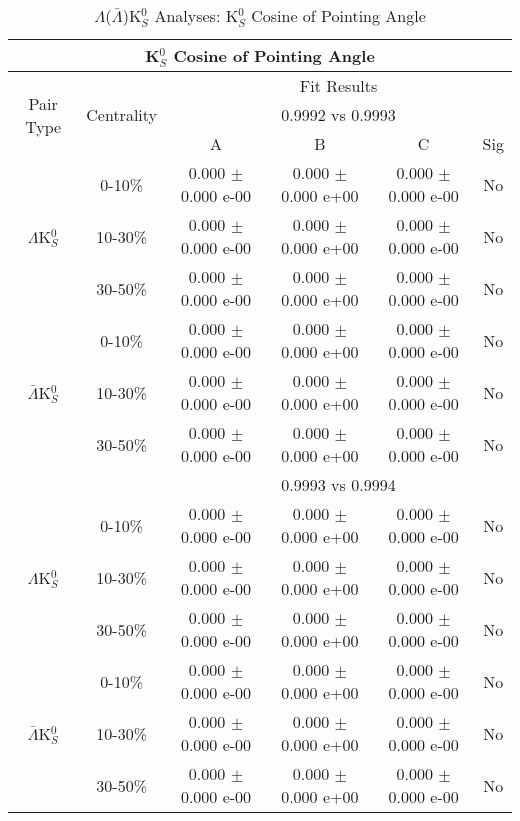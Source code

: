 \documentclass[../AnalysisNoteJBuxton.tex]{subfiles}
\begin{document}
\begin{table}
 \centering
 \begin{tabular}{|c|c|c|c|c|c|}
  \multicolumn{6}{c}{K$^{0}_{S}$ Cosine of Pointing Angle} \\
  \hline
  \multirow{3}{*}{Pair Type} & \multirow{3}{*}{Centrality} & \multicolumn{4}{c|}{Fit Results} \\
  \cline{3-6}
   & & \multicolumn{4}{c|}{0.9992 vs 0.9993} \\
  \cline{3-6}
   & & A & B & C & Sig \\
  \hline  
  \multirow{3}{*}{$\Lambda$K$^{0}_{S}$}
   &  0-10\% & 0.000 $\pm$ 0.000 e-00 & 0.000 $\pm$ 0.000 e+00 & 0.000 $\pm$ 0.000 e-00 & No \\
   & 10-30\% & 0.000 $\pm$ 0.000 e-00 & 0.000 $\pm$ 0.000 e+00 & 0.000 $\pm$ 0.000 e-00 & No \\
   & 30-50\% & 0.000 $\pm$ 0.000 e-00 & 0.000 $\pm$ 0.000 e+00 & 0.000 $\pm$ 0.000 e-00 & No \\
  \hline
  \multirow{3}{*}{$\bar{\Lambda}$K$^{0}_{S}$}  
   &  0-10\% & 0.000 $\pm$ 0.000 e-00 & 0.000 $\pm$ 0.000 e+00 & 0.000 $\pm$ 0.000 e-00 & No \\
   & 10-30\% & 0.000 $\pm$ 0.000 e-00 & 0.000 $\pm$ 0.000 e+00 & 0.000 $\pm$ 0.000 e-00 & No \\
   & 30-50\% & 0.000 $\pm$ 0.000 e-00 & 0.000 $\pm$ 0.000 e+00 & 0.000 $\pm$ 0.000 e-00 & No \\
  \hline 
  \multicolumn{2}{|c|}{} & \multicolumn{4}{c|}{0.9993 vs 0.9994} \\
  \hline  
  \multirow{3}{*}{$\Lambda$K$^{0}_{S}$}   
   &  0-10\% & 0.000 $\pm$ 0.000 e-00 & 0.000 $\pm$ 0.000 e+00 & 0.000 $\pm$ 0.000 e-00 & No \\
   & 10-30\% & 0.000 $\pm$ 0.000 e-00 & 0.000 $\pm$ 0.000 e+00 & 0.000 $\pm$ 0.000 e-00 & No \\
   & 30-50\% & 0.000 $\pm$ 0.000 e-00 & 0.000 $\pm$ 0.000 e+00 & 0.000 $\pm$ 0.000 e-00 & No \\
  \hline  
  \multirow{3}{*}{$\bar{\Lambda}$K$^{0}_{S}$}
   &  0-10\% & 0.000 $\pm$ 0.000 e-00 & 0.000 $\pm$ 0.000 e+00 & 0.000 $\pm$ 0.000 e-00 & No \\
   & 10-30\% & 0.000 $\pm$ 0.000 e-00 & 0.000 $\pm$ 0.000 e+00 & 0.000 $\pm$ 0.000 e-00 & No \\
   & 30-50\% & 0.000 $\pm$ 0.000 e-00 & 0.000 $\pm$ 0.000 e+00 & 0.000 $\pm$ 0.000 e-00 & No \\
  \hline
 \end{tabular}
 \caption{$\Lambda$($\bar{\Lambda}$)K$^{0}_{S}$ Analyses: K$^{0}_{S}$ Cosine of Pointing Angle}
 \label{tab:K0CosPointingAngleLamK0Full}
\end{table}
\end{document}
